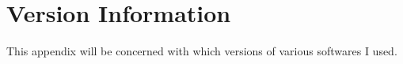 \documentclass[12pt,twoside]{reedthesis}
\theoremstyle{definition}
\begin{document}
      \chapter{Version Information}

      This appendix will be concerned with which versions of various softwares I used.



  \backmatter %

    \nocite{*}


%  
 

\end{document}
